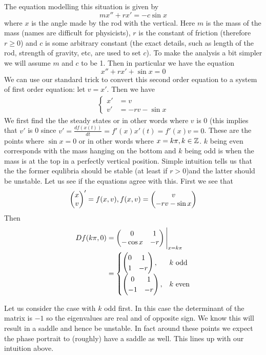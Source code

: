 The equation modelling this situation is given by
\begin{equation*}
    mx'' + rx' = -c \sin x
\end{equation*}
where $x$ is the angle made by the rod with the vertical. Here $m$ is the mass of the mass (names are difficult for physicists), $r$ is the constant of friction (therefore $r \geq 0$) and $c$ is some arbitrary constant (the exact details, such as length of the rod, strength of gravity, etc, are used to set $c$). To make the analysis a bit simpler we will assume $m$ and $c$ to be 1. Then in particular we have the equation
\begin{equation}
    x'' + rx' + \sin x = 0
\end{equation}
We can use our standard trick to convert this second order equation to a system of first order equation: let $v = x'$. Then we have
\begin{align*}
    \begin{cases}
    x' &= v\\
    v' &= -rv - \sin x
    \end{cases}
\end{align*}
We first find the the steady states or in other words where $v$ is 0 (this implies that $v'$ is 0 since $v' = \frac{df(x(t))}{dt} = f'(x) x'(t) = f'(x) v = 0$. These are the points where $\sin x = 0$ or in other words where $x = k\pi, k \in \mathbb{Z}$. $k$ being even corresponds with the mass hanging on the bottom and $k$ being odd is when the mass is at the top in a perfectly vertical position. Simple intuition tells us that the the former equlibria should be stable (at least if $r > 0$)and the latter should be unstable. Let us see if the equations agree with this. First we see that 
$$ \begin{pmatrix} x\\v \end{pmatrix}' = f(x,v), f(x, v) = \begin{pmatrix} v\\-rv - \sin x \end{pmatrix}$$
Then
\begin{align*}
    Df(k\pi, 0) &= \begin{pmatrix} 0 & 1\\-\cos x & -r \end{pmatrix}\Bigg|_{x = k\pi}\\
    &= 
    \begin{cases}
    \begin{pmatrix} 0 & 1\\1 & -r \end{pmatrix}, &k \text{ odd}\\
    \begin{pmatrix} 0 & 1\\-1 & -r \end{pmatrix}, &k \text{ even}
    \end{cases}
\end{align*}

Let us consider the case with $k$ odd first. In this case the determinant of the matrix is $-1$ so the eigenvalues are real and of opposite sign. We know this will result in a saddle and hence be unstable. In fact around these points we expect the phase portrait to (roughly) have a saddle as well. This lines up with our intuition above.

